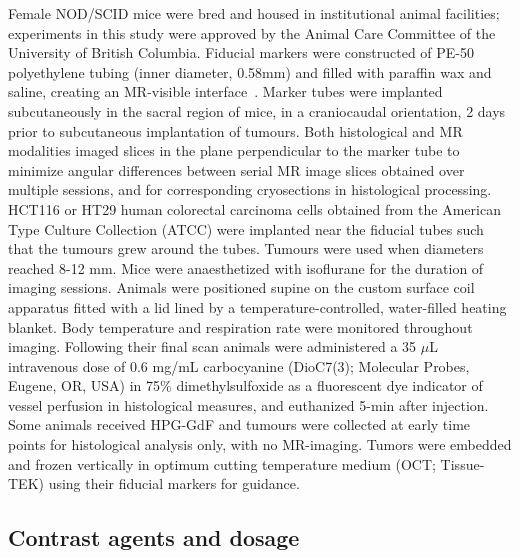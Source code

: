 Female NOD/SCID mice were bred and housed in institutional animal facilities; experiments in this study were approved by the Animal Care Committee of the University of British Columbia.
Fiducial markers were constructed of PE-50 polyethylene tubing (inner diameter, 0.58mm) and filled with paraffin wax and saline, creating an MR-visible interface~\cite{Bains:2009hh}.
Marker tubes were implanted subcutaneously in the sacral region of mice, in a craniocaudal orientation, 2 days prior to subcutaneous implantation of tumours.
Both histological and MR modalities imaged slices in the plane perpendicular to the marker tube to minimize angular differences between serial MR image slices obtained over multiple sessions, and for corresponding cryosections in histological processing.
HCT116 or HT29 human colorectal carcinoma cells obtained from the American Type Culture Collection (ATCC) were implanted near the fiducial tubes such that the tumours grew around the tubes.
Tumours were used when diameters reached 8-12 mm.
Mice were anaesthetized with isoflurane for the duration of imaging sessions.
Animals were positioned supine on the custom surface coil apparatus fitted with a lid lined by a temperature-controlled, water-filled heating blanket.
Body temperature and respiration rate were monitored throughout imaging.
Following their final scan animals were administered a 35 $\mu$L intravenous dose of 0.6 mg/mL carbocyanine (DioC7(3); Molecular Probes, Eugene, OR, USA) in 75\% dimethylsulfoxide as a fluorescent dye indicator of vessel perfusion in histological measures, and euthanized 5-min after injection.
Some animals received \acs{HPG-GdF} and tumours were collected at early time points for histological analysis only, with no MR-imaging.
Tumors were embedded and frozen vertically in optimum cutting temperature medium (OCT; Tissue-TEK) using their fiducial markers for guidance.

\subsection{Contrast agents and dosage}

